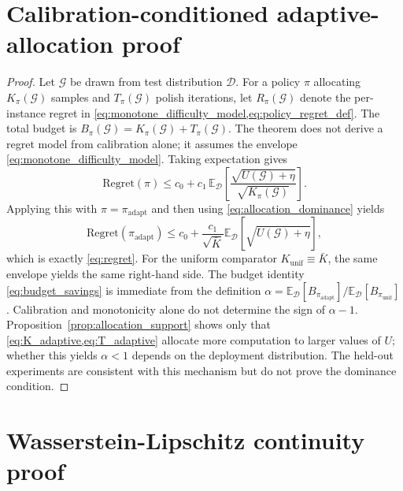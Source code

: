 \documentclass[aps,prx,reprint,superscriptaddress,longbibliography]{revtex4-2}
\newcommand{\calG}{\mathcal{G}}
\newcommand{\calD}{\mathcal{D}}
\newcommand{\bbE}{\mathbb{E}}
\begin{document}
\section{Calibration-conditioned adaptive-allocation proof}
\label{app:proof_regret}

\begin{proof}
Let $\calG$ be drawn from test distribution $\calD$. For a policy
$\pi$ allocating $K_\pi(\calG)$ samples and $T_\pi(\calG)$ polish
iterations, let $R_\pi(\calG)$ denote the per-instance regret in
\cref{eq:monotone_difficulty_model,eq:policy_regret_def}.
The total budget is $B_\pi(\calG) = K_\pi(\calG) + T_\pi(\calG)$.
The theorem does not derive a regret model from calibration alone; it
assumes the envelope \cref{eq:monotone_difficulty_model}. Taking
expectation gives
\begin{equation*}
    \mathrm{Regret}(\pi)
    \le c_0 + c_1\,\bbE_\calD\!\left[
    \frac{\sqrt{U(\calG)+\eta}}{\sqrt{K_\pi(\calG)}}
    \right].
\end{equation*}
Applying this with $\pi = \pi_{\mathrm{adapt}}$ and then using
\cref{eq:allocation_dominance} yields
\begin{equation*}
    \mathrm{Regret}(\pi_{\mathrm{adapt}})
    \le c_0 + \frac{c_1}{\sqrt{\bar K}}
    \bbE_\calD[\sqrt{U(\calG)+\eta}],
\end{equation*}
which is exactly \cref{eq:regret}. For the uniform comparator
$K_{\mathrm{unif}} \equiv \bar K$, the same envelope yields the same
right-hand side. The budget identity \cref{eq:budget_savings} is
immediate from the definition
$\alpha = \bbE_\calD[B_{\pi_{\mathrm{adapt}}}] /
\bbE_\calD[B_{\pi_{\mathrm{unif}}}]$.
Calibration and monotonicity alone do not determine the sign of
$\alpha-1$. Proposition~\ref{prop:allocation_support} shows only that
\cref{eq:K_adaptive,eq:T_adaptive} allocate more computation to larger
values of $U$; whether this yields $\alpha < 1$ depends on the
deployment distribution. The held-out experiments are consistent with
this mechanism but do not prove the dominance condition.
\end{proof}

\section{Wasserstein-Lipschitz continuity proof}
\label{app:proof_wlip}
\end{document}
